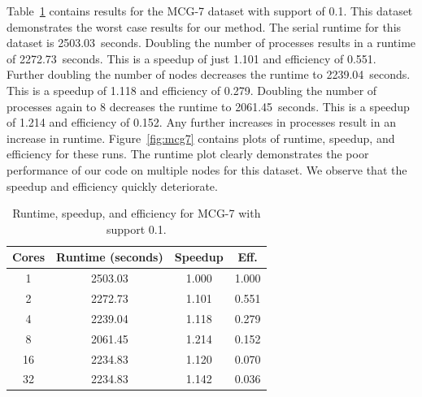 Table~\ref{tab:mcg7} contains results for the MCG-7 dataset with
support of 0.1. This dataset demonstrates the worst case results for our
method. The serial runtime for this dataset is 2503.03~seconds.
Doubling the number of processes results in a runtime of 2272.73~seconds. This
is a speedup of just 1.101 and efficiency of 0.551. Further doubling the number
of nodes decreases the runtime to 2239.04~seconds. This is a speedup of 1.118
and efficiency of 0.279. Doubling the number of processes again to 8 decreases
the runtime to 2061.45~seconds. This is a speedup of 1.214 and efficiency of
0.152. Any further increases in processes result in an increase in runtime.
Figure~\ref{fig:mcg7} contains plots of runtime, speedup, and efficiency
for these runs. The runtime plot clearly demonstrates the poor performance of
our code on multiple nodes for this dataset. We observe that the speedup and
efficiency quickly deteriorate.


\begin{table}[H]
\centering
\begin{tabular}{cccc}
\hline
Cores & Runtime (seconds) & Speedup &  Eff.  \\
\hline
 1    & 2503.03 & 1.000  & 1.000 \\
 2    & 2272.73 & 1.101  & 0.551 \\
 4    & 2239.04 & 1.118  & 0.279 \\
 8    & 2061.45 & 1.214  & 0.152 \\
16    & 2234.83 & 1.120  & 0.070 \\
32    & 2234.83 & 1.142  & 0.036 \\
\hline
\end{tabular}
\caption{Runtime, speedup, and efficiency for MCG-7 with support
         0.1.}
\label{tab:mcg7}
\end{table}

